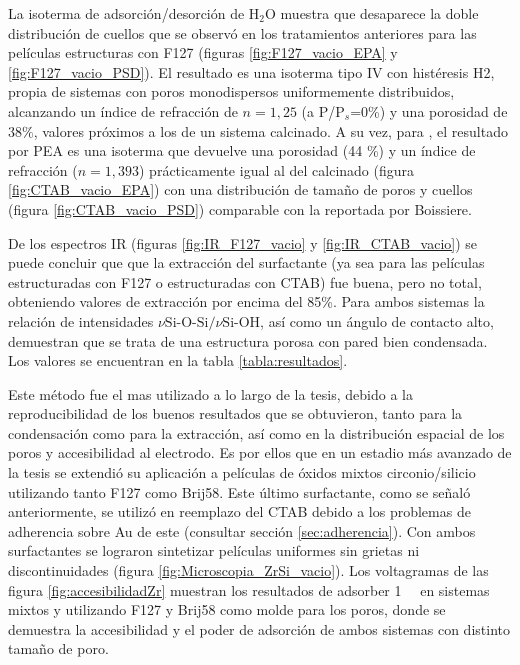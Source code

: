		 La isoterma de adsorción/desorción de H$_2$O muestra que desaparece la doble distribución de cuellos que se observó en los tratamientos anteriores para las películas estructuras con F127 (figuras \ref{fig:F127_vacio_EPA} y \ref{fig:F127_vacio_PSD}). El resultado es una isoterma tipo IV con histéresis H2, propia de sistemas con poros monodispersos uniformemente distribuidos, alcanzando un índice de refracción de $n=1,25$ (a P/P$_s$=0\%) y una porosidad de $38\%$, valores próximos a los de un sistema calcinado. A su vez, para \pdmC, el resultado por PEA es una isoterma que devuelve una porosidad (44 \%) y un índice de refracción ($n=1,393$) prácticamente igual al del calcinado (figura \ref{fig:CTAB_vacio_EPA}) con una distribución de tamaño de poros y cuellos (figura \ref{fig:CTAB_vacio_PSD}) comparable con la reportada por Boissiere\cite{Boissiere2005}.

		 De los espectros IR  (figuras \ref{fig:IR_F127_vacio} y \ref{fig:IR_CTAB_vacio}) se puede concluir que que la extracción del surfactante (ya sea para las películas estructuradas con F127 o estructuradas con CTAB) fue buena, pero no total, obteniendo valores de extracción por encima del 85\%. Para ambos sistemas la relación de intensidades $\nu{\text{Si-O-Si/}}\nu{\text{Si-OH}}$, así como un ángulo de contacto alto, demuestran que se trata de una estructura porosa con pared bien condensada. Los valores se encuentran en la tabla \ref{tabla:resultados}.

		 Este método fue el mas utilizado a lo largo de la tesis, debido a la reproducibilidad de los buenos resultados que se obtuvieron, tanto para la condensación como para la extracción, así como en la distribución espacial de los poros y accesibilidad al electrodo. Es por ellos que en un estadio más avanzado de la tesis se extendió su aplicación a películas de óxidos mixtos circonio/silicio utilizando tanto F127 como Brij58. Este último surfactante, como se señaló anteriormente, se utilizó en reemplazo del CTAB debido a los problemas de adherencia sobre Au de este (consultar sección \ref{sec:adherencia}). Con ambos surfactantes se lograron sintetizar películas uniformes sin grietas ni discontinuidades (figura \ref{fig:Microscopia_ZrSi_vacio}). Los voltagramas de las figura \ref{fig:accesibilidadZr} muestran los resultados de adsorber \aminorutenio\space \SI{1}{\milli\Molar} en sistemas mixtos \pdmZ\space y \pdmZB\space utilizando F127 y Brij58 como molde para los poros, donde se demuestra la accesibilidad y el poder de adsorción de ambos sistemas con distinto tamaño de poro.

